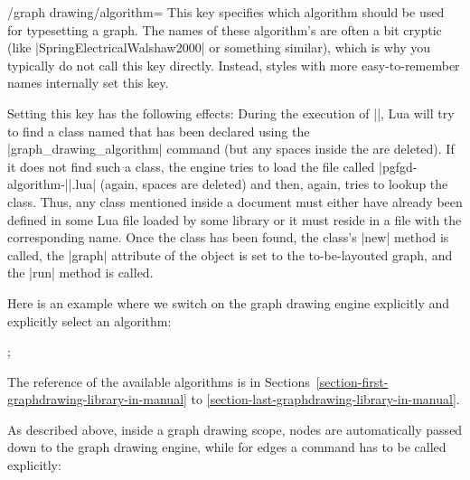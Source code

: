 \begin{key}{/graph drawing/algorithm=}
  \label{section-gd-algorithm-key}%
  This key specifies which algorithm should be used for typesetting a
  graph. The names of these algorithm's are often a bit cryptic (like
  |SpringElectricalWalshaw2000| or something similar), which is why
  you typically do not call this key directly. Instead, styles with more
  easy-to-remember names internally set this key.

  Setting this key has the following effects: During the execution of
  |\pgfgdendscope|, Lua will try to find a class
  named  that has been declared using the
  |graph_drawing_algorithm| command (but any spaces inside the
   are deleted). If it does not find such a
  class, the engine tries to  
  load the file called |pgfgd-algorithm-||.lua|
  (again, spaces are deleted) and then, again, tries to lookup the
  class. Thus, any class  mentioned inside a
  document must either have 
  already been defined in some Lua file loaded by some library or it
  must reside in a file with the corresponding name. Once the class
  has been found, the class's |new| method is called, the |graph|
  attribute of the object is set to the to-be-layouted graph, and the
  |run| method is called.
  
  Here is an example where we switch on the graph drawing engine
  explicitly and explicitly select an algorithm:
\begin{codeexample}[]
\tikz [graph drawing scope,
       /graph drawing/algorithm=pgf.gd.force.SpringElectricalWalshaw2000]
  ;  
\end{codeexample}
  The reference of the available algorithms is in
  Sections~\ref{section-first-graphdrawing-library-in-manual} to 
  \ref{section-last-graphdrawing-library-in-manual}.
\end{key}




As described above, inside a graph drawing scope, nodes are
automatically passed down to the graph drawing engine, while for edges
a command has to be called explicitly:

